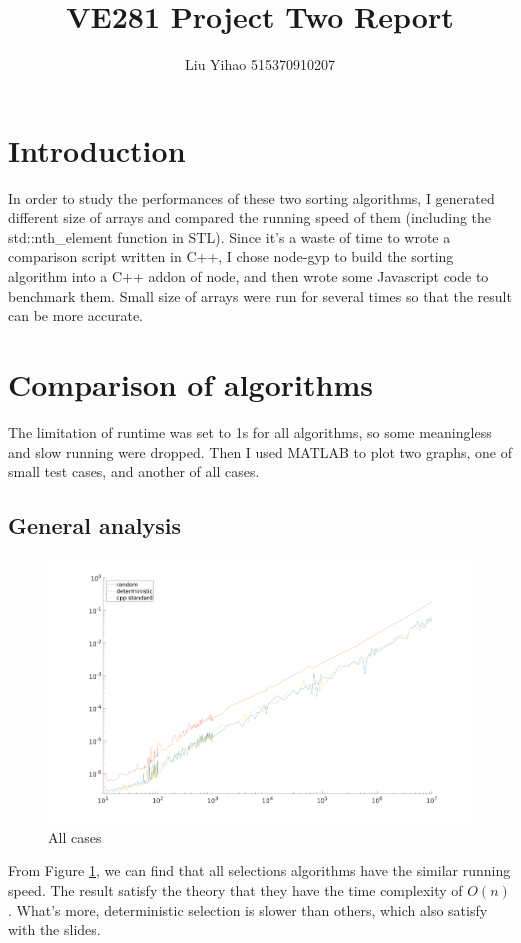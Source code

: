 \documentclass{article}
\title{VE281 Project Two Report}
\author{Liu Yihao 515370910207}
\date{}
\begin{document}
\maketitle

\section{Introduction}

In order to study the performances of these two sorting algorithms, I generated different size of arrays and compared the running speed of them (including the std::nth\_element function in STL). Since it's a waste of time to wrote a comparison script written in C++, I chose node-gyp to build the sorting algorithm into a C++ addon of node, and then wrote some Javascript code to benchmark them. Small size of arrays were run for several times so that the result can be more accurate.

\section{Comparison of algorithms}

The limitation of runtime was set to 1s for all algorithms, so some meaningless and slow running were dropped. Then I used MATLAB to plot two graphs, one of small test cases, and another of all cases.

\subsection{General analysis}

\begin{figure}[!htbp]
\centering
\includegraphics[width=0.8\linewidth]{../benchmark/fig1.png}
\caption{All cases}
\label{fig-1}
\end{figure}

From Figure \ref{fig-1}, we can find that all selections algorithms have the similar running speed. The result satisfy the theory that they have the time complexity of $O(n)$. What's more, deterministic selection is slower than others, which also satisfy with the slides.
\end{document}
